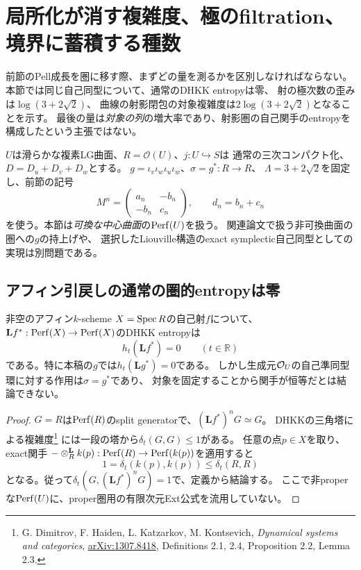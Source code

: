 \section{局所化が消す複雑度、極のfiltration、境界に蓄積する種数}
\label{sec:localization-entropy}
前節のPell成長を圏に移す際、まずどの量を測るかを区別しなければならない。
本節では同じ自己同型について、通常のDHKK entropyは零、
射の極次数の歪みは$\log(3+2\sqrt2)$、
曲線の射影閉包の対象複雑度は$2\log(3+2\sqrt2)$となることを示す。
最後の量は\emph{対象の列}の増大率であり、射影圏の自己関手のentropyを
構成したという主張ではない。

$U$は滑らかな複素LG曲面、$R=\mathcal O(U)$、$j:U\hookrightarrow S$は
通常の三次コンパクト化、$D=D_u+D_v+D_w$とする。
$g=\iota_v\iota_w\iota_u\iota_w$、$\sigma=g^*:R\to R$、
$\Lambda=3+2\sqrt2$を固定し、前節の記号
\[
 M^n=\begin{pmatrix}a_n&-b_n\\-b_n&c_n\end{pmatrix},
 \qquad d_n=b_n+c_n
\]
を使う。本節は\emph{可換な中心曲面}の$\operatorname{Perf}(U)$を扱う。
関連論文で扱う非可換曲面の圏への$g$の持上げや、
選択したLiouville構造のexact symplectic自己同型としての実現は別問題である。

\subsection{アフィン引戻しの通常の圏的entropyは零}
\begin{proposition}[固定生成元と射への非自明な作用]
\label{prop:affine-pullback-zero-entropy}
非空のアフィン$k$-scheme $X=\operatorname{Spec} R$の自己射$f$について、
$\mathbf Lf^*: \operatorname{Perf}(X)\to\operatorname{Perf}(X)$のDHKK entropyは
\[
 h_t(\mathbf Lf^*)=0\qquad(t\in\mathbb R)
\]
である。特に本稿の$g$では$h_t(\mathbf Lg^*)=0$である。
しかし生成元$\mathcal O_U$の自己準同型環に対する作用は$\sigma=g^*$であり、
対象を固定することから関手が恒等だとは結論できない。
\end{proposition}
\begin{proof}
$G=R$は$\operatorname{Perf}(R)$のsplit generatorで、$(\mathbf Lf^*)^nG\simeq G$。
DHKKの三角塔による複雑度\footnote{
G. Dimitrov, F. Haiden, L. Katzarkov, M. Kontsevich,
\emph{Dynamical systems and categories},
\href{https://arxiv.org/abs/1307.8418}{arXiv:1307.8418},
Definitions 2.1, 2.4, Proposition 2.2, Lemma 2.3.}
には一段の塔から$\delta_t(G,G)\le1$がある。
任意の点$p\in X$を取り、exact関手
$-\otimes_R^{\mathbf L}k(p):\operatorname{Perf}(R)\to\operatorname{Perf}(k(p))$を適用すると
\[
 1=\delta_t(k(p),k(p))\le\delta_t(R,R)
\]
となる。従って$\delta_t(G,(\mathbf Lf^*)^nG)=1$で、定義から結論する。
ここで非properな$\operatorname{Perf}(U)$に、proper圏用の有限次元Ext公式を流用していない。
\end{proof}

